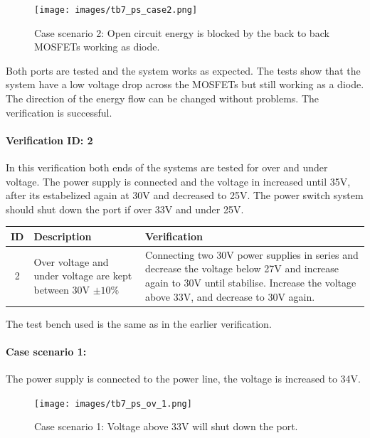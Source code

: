 \begin{figure}[H]
	\begin{centering}
		\texttt{[image: images/tb7\_ps\_case2.png]}
		\caption{Case scenario 2: Open circuit energy is blocked by the back to back MOSFETs working as diode.}
	\end{centering}
\end{figure}

Both ports are tested and the system works as expected. The tests show that the system have a low voltage drop across the MOSFETs but still working as a diode. The direction of the energy flow can be changed without problems. The verification is successful.

\paragraph{Verification ID: 2}
In this verification both ends of the systems are tested for over and under voltage. The power supply is connected and the voltage in increased until 35V, after its estabelized again at 30V and decreased to 25V. The power switch system should shut down the port if over 33V and under 25V.

\begin{table}[H]
\centering
	\begin{tabular}{| c | l | p{7cm} | }
		\hline
		ID & Description & Verification \\\hline
		2 & Over voltage and under voltage are kept between 30V $ \pm10\% $ & Connecting two 30V power supplies in series and decrease the voltage below 27V and increase again to 30V until stabilise. Increase the voltage above 33V, and decrease to 30V again. \\\hline
	\end{tabular}
\end{table}

The test bench used is the same as in the earlier verification.

\paragraph{Case scenario 1:} The power supply is connected to the power line, the voltage is increased to 34V.

\begin{figure}[H]
	\begin{centering}
		\texttt{[image: images/tb7\_ps\_ov\_1.png]}
		\caption{Case scenario 1: Voltage above 33V will shut down the port.}
	\end{centering}
\end{figure}


